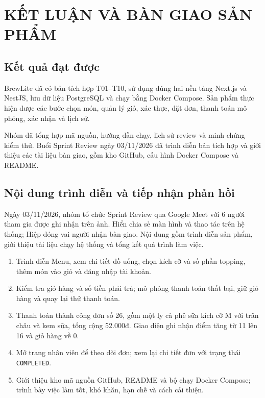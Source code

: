 \documentclass[12pt,a4paper]{report}
\begin{document}
\chapter{KẾT LUẬN VÀ BÀN GIAO SẢN PHẨM}

\section{Kết quả đạt được}

BrewLite đã có bản tích hợp T01–T10, sử dụng đúng hai nền tảng Next.js và NestJS, lưu dữ liệu PostgreSQL và chạy bằng Docker Compose. Sản phẩm thực hiện được các bước chọn món, quản lý giỏ, xác thực, đặt đơn, thanh toán mô phỏng, xác nhận và lịch sử.


Nhóm đã tổng hợp mã nguồn, hướng dẫn chạy, lịch sử review và minh chứng kiểm thử. Buổi Sprint Review ngày 03/11/2026 đã trình diễn bản tích hợp và giới thiệu các tài liệu bàn giao, gồm kho GitHub, cấu hình Docker Compose và README.


\section{Nội dung trình diễn và tiếp nhận phản hồi}

Ngày 03/11/2026, nhóm tổ chức Sprint Review qua Google Meet với 6 người tham gia được ghi nhận trên ảnh. Hiển chia sẻ màn hình và thao tác trên hệ thống; Hiệp đóng vai người nhận bàn giao. Nội dung gồm trình diễn sản phẩm, giới thiệu tài liệu chạy hệ thống và tổng kết quá trình làm việc.


\begin{enumerate}
    \item Trình diễn Menu, xem chi tiết đồ uống, chọn kích cỡ và số phần topping, thêm món vào giỏ và đăng nhập tài khoản.
    \item Kiểm tra giỏ hàng và số tiền phải trả; mô phỏng thanh toán thất bại, giữ giỏ hàng và quay lại thử thanh toán.
    \item Thanh toán thành công đơn số 26, gồm một ly cà phê sữa kích cỡ M với trân châu và kem sữa, tổng cộng 52.000đ. Giao diện ghi nhận điểm tăng từ 11 lên 16 và giỏ hàng về 0.
    \item Mở trang nhân viên để theo dõi đơn; xem lại chi tiết đơn với trạng thái \texttt{COMPLETED}.
    \item Giới thiệu kho mã nguồn GitHub, README và bộ chạy Docker Compose; trình bày việc làm tốt, khó khăn, hạn chế và cách cải thiện.
\end{enumerate}
\end{document}
